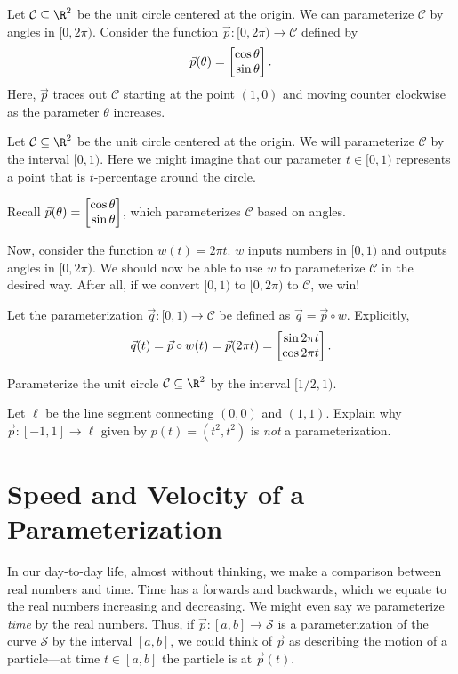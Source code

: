 \begin{example}[A Circle]
	Let $\mathcal C\subseteq \R^2$ be the unit circle centered at the origin.
	We can parameterize $\mathcal C$ by angles in $[0,2\pi)$.  Consider the function
	$\vec p:[0,2\pi)\to\mathcal C$ defined by
	\[
		\vec p(\theta) = \mat{\cos\theta \\\sin \theta}.	
	\]
	Here, $\vec p$ traces out $\mathcal C$ starting at the point $(1,0)$ and
	moving counter clockwise as the parameter $\theta$ increases.
\end{example}
\begin{example}
	Let $\mathcal C\subseteq \R^2$ be the unit circle centered at the origin.
	We will parameterize $\mathcal C$ by the interval $[0,1)$.  Here we might
	imagine that our parameter $t\in[0,1)$ represents a point that is $t$-percentage
	around the circle.  
	
	Recall $\vec p(\theta)=\mat{\cos \theta\\\sin\theta}$, which parameterizes
	$\mathcal C$ based on angles.
	
	Now, consider the function $w(t) =2\pi t$.
	$w$ inputs numbers in $[0,1)$ and outputs angles in $[0,2\pi)$.  We should
	now be able to use $w$ to parameterize $\mathcal C$ in the desired way.
	After all, if we convert $[0,1)$ to $[0,2\pi)$ to $\mathcal C$, we win!

	Let the parameterization
		$\vec q:[0,1)\to\mathcal C$ be defined as $\vec q=\vec p\circ w$.
	Explicitly,
	\[
		\vec q(t) = \vec p\circ w(t) = \vec p(2\pi t) = \mat{\sin 2\pi t\\\cos 2\pi t}.	
	\]
\end{example}

\begin{exercise}
	Parameterize the unit circle $\mathcal C\subseteq \R^2$ by the interval $[1/2,1)$.
\end{exercise}
\begin{exercise}
	Let $\ell$ be the line segment connecting $(0,0)$ and $(1,1)$.
	Explain why $\vec p:[-1,1]\to\ell$ given by $p(t)=(t^2,t^2)$ is \emph{not}
	a parameterization.
\end{exercise}

\section{Speed and Velocity of a Parameterization}

In our day-to-day life, almost without thinking, we make a comparison between real numbers
and time.  Time has a forwards and backwards, which we equate to
the real numbers increasing and decreasing.  We might even say we parameterize \emph{time}
by the real numbers.  Thus, if $\vec p:[a,b]\to \mathcal S$ is a parameterization 
of the curve $\mathcal S$ by the interval $[a,b]$, we could think of $\vec p$ as describing
the motion of a particle---at time $t\in[a,b]$ the particle is at $\vec p(t)$.

